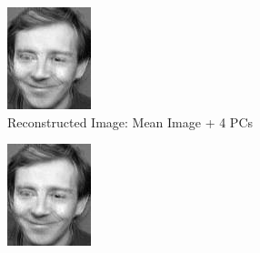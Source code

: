 \documentclass[12pt]{article}
\begin{document}
\begin{figure}
\begin{subfigure}[b]{0.20\textwidth}
		\includegraphics[width=\textwidth]{Task4.3_Images/ReconstructedImage4.jpg}
		\caption{Reconstructed Image: Mean Image + 4 PCs}
	\end{subfigure}\quad
	\begin{subfigure}[b]{0.20\textwidth}
		\includegraphics[width=\textwidth]{Task4.3_Images/ReconstructedImage5.jpg}

\end{subfigure}
\end{figure}
\end{document}
